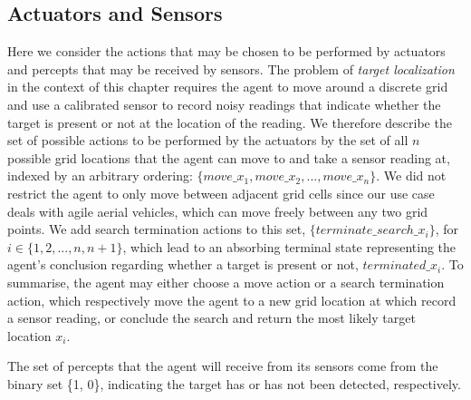 \subsection{Actuators and Sensors}
Here we consider the actions that may be chosen to be performed by actuators and percepts that may be received by sensors. The problem of \textit{target localization} in the context of this chapter requires the agent to move around a discrete grid and use a calibrated sensor to record noisy readings that indicate whether the target is present or not at the location of the reading. We therefore describe the set of possible actions to be performed by the actuators by the set of all $n$ possible grid locations that the agent can move to and take a sensor reading at, indexed by an arbitrary ordering: $\{move\_x_1, move\_x_2, ..., move\_x_n\}$. We did not restrict the agent to only move between adjacent grid cells since our use case deals with agile aerial vehicles, which can move freely between any two grid points. We add search termination actions to this set, $\{terminate\_search\_x_{i}\}$, for $i \in \{1, 2, ..., n, n+1\}$, which lead to an absorbing terminal state representing the agent's conclusion regarding whether a target is present or not, $terminated\_x_{i}$. To summarise, the agent may either choose a move action or a search termination action, which respectively move the agent to a new grid location at which record a sensor reading, or conclude the search and return the most likely target location $x_i$. \par

The set of percepts that the agent will receive from its sensors come from the binary set \{1, 0\}, indicating the target has or has not been detected, respectively.\par
